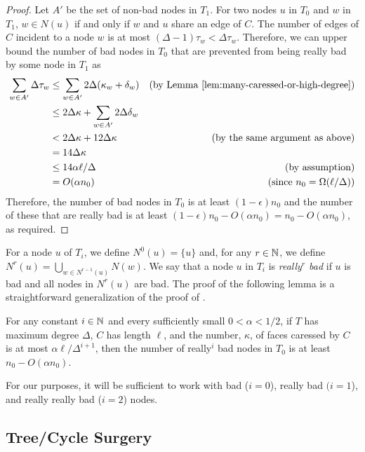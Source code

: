 \documentclass{patmorin}
\begin{document}
\begin{proof}
  Let $A'$ be the set of non-bad nodes in $T_1$.  For two
  nodes $u$ in $T_0$ and $w$ in $T_1$,  $w\in N(u)$ if and only if $w$
  and $u$ share an edge of $C$.  The number of edges of $C$ incident to a node $w$ is at most $(\Delta-1)\tau_w < \Delta\tau_w$.  Therefore, we can upper bound the number of bad nodes in $T_0$ that are prevented from being really bad by some node in $T_1$ as
  \begin{align*}
   \sum_{w\in A'}\Delta \tau_w  
    & \le  \sum_{w\in A'}2\Delta(\kappa_w + \delta_w) & \text{(by \lemref{many-caressed-or-high-degree})} \\
    & \le  2\Delta\kappa + \sum_{w\in A'}2\Delta\delta_w \\
    & < 2\Delta\kappa + 12\Delta\kappa & \text{(by the same argument as above)}\\
    & = 14\Delta\kappa \\
    & \le 14\alpha\ell/\Delta & \text{(by assumption)}\\
    & = O(\alpha n_0) & \text{(since $n_0=\Omega(\ell/\Delta)$)}
  \end{align*}
  Therefore, the number of bad nodes in $T_0$ is at least
  $(1-\epsilon)n_0$ and the number of these that are really bad is
  at least $(1-\epsilon)n_0 - O(\alpha n_0) = n_0-O(\alpha n_0)$,
  as required.
\end{proof}

For a node $u$ of $T_i$, we define $N^0(u) = \{u\}$ and, for any $r\in\mathbb{N}$,
we define $N^{r}(u)=\bigcup_{w\in N^{r-1}(u)} N(w)$.   We say that a node
$u$ in $T_i$ is \emph{really$^{r}$ bad} if $u$ is bad and all nodes in
$N^r(u)$ are bad.  The proof of the following lemma is a straightforward
generalization of the proof of .

\begin{lem}
  For any constant $i\in\mathbb{N}$ and every sufficiently small $0<\alpha < 1/2$,  
  if $T$ has maximum degree $\Delta$, $C$ has length $\ell$, and the number,
  $\kappa$, of faces caressed by $C$ is at most $\alpha\ell/\Delta^{i+1}$, then
  the number of really$^i$ bad nodes in $T_0$ is at least $n_0-O(\alpha n_0)$.
\end{lem}

For our purposes, it will be sufficient to work with bad ($i=0$), really
bad $(i=1$), and really really bad ($i=2$) nodes.

\subsection{Tree/Cycle Surgery}
\end{document}

